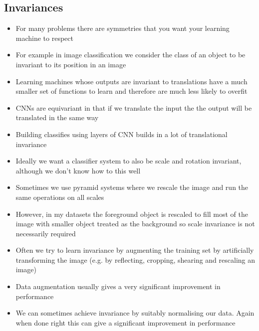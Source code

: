 \documentclass[11pt]{article}
\begin{document}
\subsection{Invariances}
\label{sec:org85831ee}
\begin{itemize}
\item For many problems there are symmetries that you want your learning machine to 
respect
\item For example in image classification we consider the class of an object to be
invariant to its position in an image
\item Learning machines whose outputs are invariant to translations have a much smaller
set of functions to learn and therefore are much less likely to overfit
\item CNNs are equivariant in that if we translate the input the the output will be translated
in the same way
\item Building classifies using layers of CNN builds in a lot of translational invariance
\item Ideally we want a classifier system to also be scale and rotation invariant, although we
don't know how to this well
\item Sometimes we use pyramid systems where we rescale the image and run the same
operations on all scales
\item However, in my datasets the foreground object is rescaled to fill most of the image
with smaller object treated as the background so scale invariance is not necessarily
required
\item Often we try to learn invariance by augmenting the training set by artificially
transforming the image (e.g. by reflecting, cropping, shearing and rescaling an image)
\item Data augmentation usually gives a very significant improvement in performance
\item We can sometimes achieve invariance by suitably normalising our data.  Again when
done right this can give a significant improvement in performance
\end{itemize}
\end{document}
